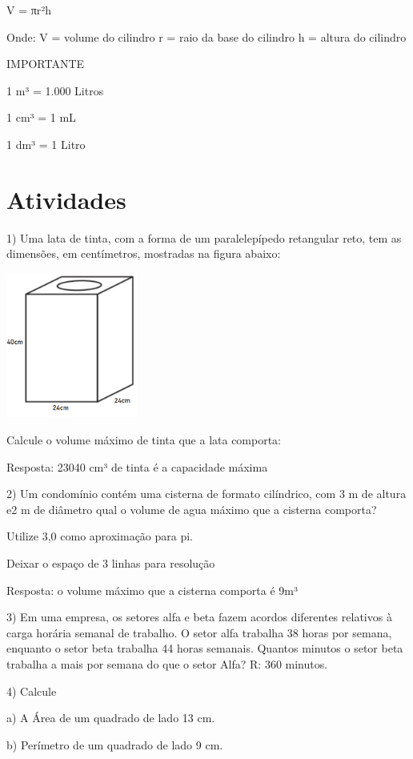 V = πr²h

Onde: V = volume do cilindro r = raio da base do cilindro h = altura do
cilindro

IMPORTANTE

1 m³ = 1.000 Litros

1 cm³ = 1 mL

1 dm³ = 1 Litro

\section{Atividades}

1) Uma lata de tinta, com a forma de um paralelepípedo retangular reto,
tem as dimensões, em centímetros, mostradas na figura abaixo:

\includegraphics[width=1.69792in,height=1.88115in]{./imgSAEB_6_MAT/media/image95.png}

Calcule o volume máximo de tinta que a lata comporta:

Resposta: 23040 cm³ de tinta é a capacidade máxima

2) Um condomínio contém uma cisterna de formato cilíndrico, com 3 m de
altura e2 m de diâmetro qual o volume de agua máximo que a cisterna
comporta?

Utilize 3,0 como aproximação para pi.

Deixar o espaço de 3 linhas para resolução

Resposta: o volume máximo que a cisterna comporta é 9m³

3) Em uma empresa, os setores alfa e beta fazem acordos diferentes
relativos à carga horária semanal de trabalho. O setor alfa trabalha 38
horas por semana, enquanto o setor beta trabalha 44 horas semanais.
Quantos minutos o setor beta trabalha a mais por semana do que o setor
Alfa? R: 360 minutos.

4) Calcule

a) A Área de um quadrado de lado 13 cm.

b) Perímetro de um quadrado de lado 9 cm.


